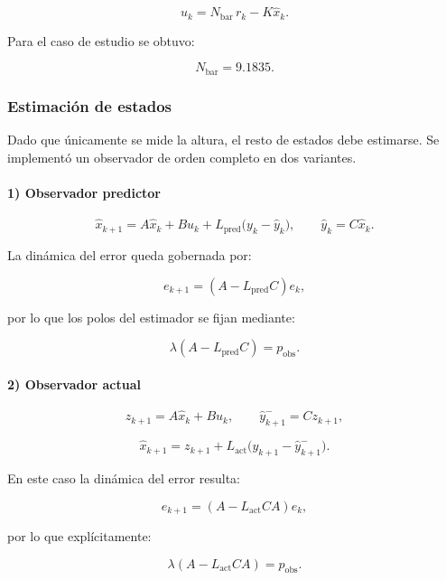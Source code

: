 \[
u_k = N_{\text{bar}}\,r_k - K\hat{x}_k.
\]

Para el caso de estudio se obtuvo:

\[
N_{\text{bar}} = 9.1835.
\]

\subsubsection{Estimación de estados}

Dado que únicamente se mide la altura, el resto de estados debe estimarse.
Se implementó un observador de orden completo en dos variantes.

\paragraph{1) Observador predictor}

\[
\hat{x}_{k+1}
=
A\hat{x}_k + Bu_k + L_{\text{pred}}\big(y_k-\hat{y}_k\big),
\qquad
\hat{y}_k=C\hat{x}_k.
\]

La dinámica del error queda gobernada por:

\[
e_{k+1}=(A-L_{\text{pred}}C)e_k,
\]

por lo que los polos del estimador se fijan mediante:

\[
\lambda(A-L_{\text{pred}}C)=p_{\text{obs}}.
\]

\paragraph{2) Observador actual}

\[
z_{k+1}=A\hat{x}_k+Bu_k,
\qquad
\hat{y}_{k+1}^- = C z_{k+1},
\]

\[
\hat{x}_{k+1}=z_{k+1}+L_{\text{act}}\big(y_{k+1}-\hat{y}_{k+1}^-\big).
\]

En este caso la dinámica del error resulta:

\[
e_{k+1}=(A-L_{\text{act}}CA)e_k,
\]

por lo que explícitamente:

\[
\lambda(A-L_{\text{act}}CA)=p_{\text{obs}}.
\]

